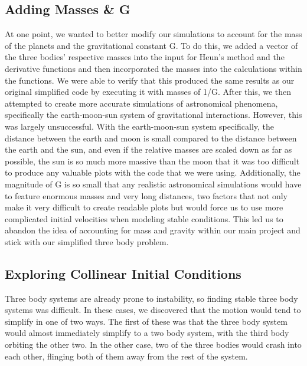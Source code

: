 \documentclass{article}
\begin{document}
\subsection{Adding Masses \& G}
At one point, we wanted to better modify our simulations to account for the mass of the planets and the gravitational constant G. To do this, we added a vector of the three bodies' respective masses into the input for Heun’s method and the derivative functions and then incorporated the masses into the calculations within the functions. We were able to verify that this produced the same results as our original simplified code by executing it with masses of 1/G. After this, we then attempted to create more accurate simulations of astronomical phenomena, specifically the earth-moon-sun system of gravitational interactions. However, this was largely unsuccessful. With the earth-moon-sun system specifically, the distance between the earth and moon is small compared to the distance between the earth and the sun, and even if the relative masses are scaled down as far as possible, the sun is so much more massive than the moon that it was too difficult to produce any valuable plots with the code that we were using. 
	Additionally, the magnitude of G is so small that any realistic astronomical simulations would have to feature enormous masses and very long distances, two factors that not only make it very difficult to create readable plots but would force us to use more complicated initial velocities when modeling stable conditions. This led us to abandon the idea of accounting for mass and gravity within our main project and stick with our simplified three body problem. 

\subsection{Exploring Collinear Initial Conditions}
Three body systems are already prone to instability, so finding stable three body systems was difficult. In these cases, we discovered that the motion would tend to simplify in one of two ways. The first of these was that the three body system would almost immediately simplify to a two body system, with the third body orbiting the other two. In the other case, two of the three bodies would crash into each other, flinging both of them away from the rest of the system. 
\end{document}
